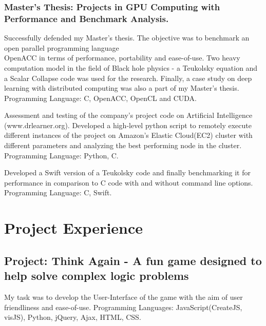 \documentclass{Mihir_Kavatkar-Resume}
\begin{document}
		\vspace*{-0.5em}
		\subsubsection{Master's Thesis: Projects in GPU Computing with Performance and Benchmark Analysis.}
		\fourbullets
		{Successfully defended my Master's thesis. The objective was to benchmark an open parallel programming language\\ OpenACC in terms of performance, portability and ease-of-use.}{ Two heavy computation model in the field of Black hole physics - a Teukolsky equation and a Scalar Collapse code was used for the research.} {Finally, a case study on deep learning with distributed computing was also a part of my Master's thesis.}
		{Programming Language: C, OpenACC, OpenCL and CUDA.}
		
		\vspace*{-0.5em}
		\threebullets
		{Assessment and testing of the company's project code on Artificial Intelligence (www.drlearner.org). }{Developed a high-level python script to remotely execute different instances of the project on Amazon's Elastic Cloud(EC2) cluster with different parameters and analyzing the best performing node in the cluster.}
		{Programming Language: Python, C.}
		
		\vspace*{-0.5em}
		\workitems
		{Developed a Swift version of a Teukolsky code and finally benchmarking it for performance in comparison to C code with and without command line options.}
		{Programming Language: C, Swift.}
		
	\section{Project Experience}
		\vspace*{-0.5em}
		\subsection{Project: Think Again - A fun game designed to help solve complex logic problems}
		\vspace*{-0.5em}
		\workitems
		{My task was to develop the User-Interface of the game with the aim of user friendliness and ease-of-use. }
		{Programming Languages: JavaScript(CreateJS, visJS), Python, jQuery, Ajax, HTML, CSS.}
		
\end{document}
